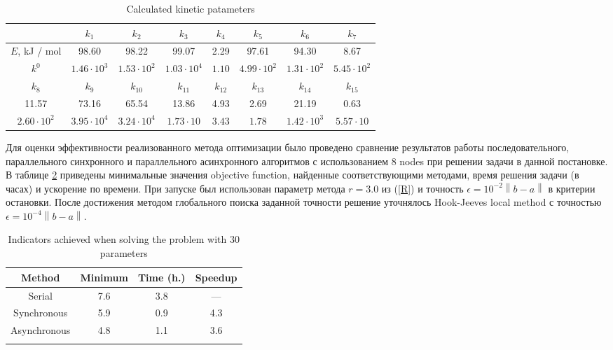 \documentclass{svproc}
\begin{document}
\begin{table}
\label{table_res1}
\caption{Calculated kinetic patameters}
\begin{center}
\begin{tabular}{cccccccc}
\hline
 & $k_1$ & $k_2$ & $k_3$ & $k_4$ & $k_5$ & $k_6$ & $k_7$\\
\hline\rule{0pt}{12pt}
$E$, kJ / mol & 98.60 & 98.22 & 99.07 & 2.29 & 97.61 & 94.30 & 8.67\\
$k^0$ & $1.46\cdot10^3$ & $1.53\cdot10^2$ & $1.03\cdot10^4$ & $1.10$ & $4.99\cdot10^2$  & $1.31\cdot10^2$ & $5.45\cdot10^2$\\
\hline
$k_8$ & $k_9$ & $k_{10}$ & $k_{11}$ & $k_{12}$ & $k_{13}$ & $k_{14}$ & $k_{15}$ \\
\hline\rule{0pt}{12pt}
11.57 & 73.16 & 65.54 & 13.86 & 4.93 & 2.69 & 21.19 & 0.63\\
$2.60\cdot10^2$ & $3.95\cdot10^4$ & $3.24\cdot10^4$ & $1.73\cdot10$ & $3.43$ & $1.78$ & $1.42\cdot10^3$ & $5.57\cdot10$\\[2pt]
\hline
\end{tabular}\end{center}\end{table}

Для оценки эффективности реализованного метода оптимизации было проведено сравнение результатов работы последовательного, параллельного синхронного и параллельного асинхронного алгоритмов с использованием 8 nodes при решении задачи в данной постановке. В таблице \ref{table_30D} приведены минимальные значения objective function, найденные соответствующими методами, время решения задачи (в часах) и ускорение по времени. При запуске был использован параметр метода $r=3.0$ из (\ref{R}) и точность $\epsilon = 10^{-2}\left\|b-a\right\|$ в критерии остановки. После достижения методом глобального поиска заданной точности решение уточнялось Hook-Jeeves local method \cite{HookJeeves} с точностью $\epsilon = 10^{-4}\left\|b-a\right\|$.

\begin{table}
\caption{Indicators achieved when solving the problem with 30 parameters}
\label{table_30D}
\begin{center}
\begin{tabular}{cccc}
\hline\noalign{\smallskip}
 Method      & Minimum  & Time (h.) & Speedup \\
\hline\noalign{\smallskip}
Serial       & 7.6   &    3.8     &  ---        \\
Synchronous  & 5.9   &   0.9     &   4.3       \\
Asynchronous & 4.8   &   1.1     &   3.6       \\
\noalign{\smallskip}\hline
\end{tabular}\end{center}\end{table}
\end{document}
